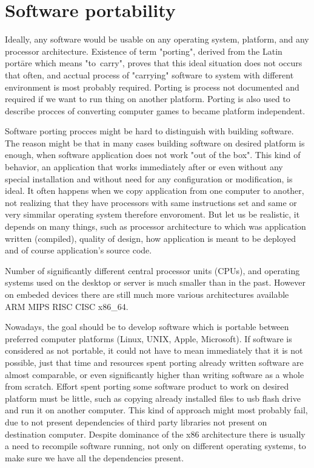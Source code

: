 \chapter{Software portability}\label{porting}

Ideally, any software would be usable on any operating system, platform, and any processor architecture.
Existence of term "porting", derived from the Latin portāre which means "to~carry", proves that this ideal situation does not occurs that often, and acctual process of "carrying" software to system with different environment is most probably required.
Porting is process not documented and required if we want to run thing on another platform.
Porting is also used to describe procces of converting computer games to became platform independent.

Software porting procces might be hard to distinguish with building software.
The reason might be that in many cases building software on desired platform is enough, when software application does not work "out of the box".
This kind of behavior, an application that works immediately after or even without any special installation and without need for any configuration or modification, is ideal.
It often happens when we copy application from one computer to another, not realizing that they have processors with same instructions set and same or very simmilar operating system therefore envoroment.
But let us be realistic, it depends on many things, such as processor architecture to which was application written (compiled), quality of design, how application is meant to be deployed and of course application's source code.

Number of significantly different central processor units (CPUs), and operating systems used on the desktop or server is much smaller than in the past.
However on embeded devices there are still much more various architectures available ARM MIPS  RISC CISC x86\_64. 

Nowadays, the goal should be to develop software which is portable between preferred computer platforms (Linux, UNIX, Apple, Microsoft).
If software is considered as not portable, it could not have to mean immediately that it is not possible, just that time and resources spent porting already written software are almost comparable, or even significantly higher than writing software as a whole from scratch.
Effort spent porting some software product to work on desired platform must be little, such as copying already installed files to usb flash drive and run it on another computer.
This kind of approach might most probably fail, due to not present dependencies of third party libraries not present on destination computer.
Despite dominance of the x86 architecture there is usually a need to recompile software running, not only on different operating systems, to make sure we have all the dependencies present.

